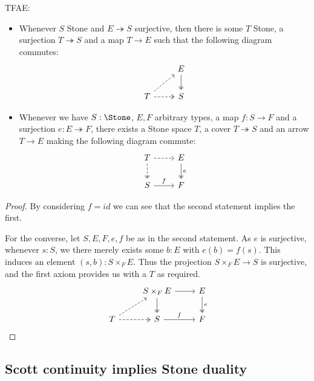 \begin{lemma}
  TFAE:
  \begin{itemize}
\item  Whenever $S$ Stone and $E\twoheadrightarrow S$ surjective, then there is some $T$ Stone,
    a surjection $T \twoheadrightarrow S$ and a map $T\to E$ 
    such that the following diagram commutes:
    \begin{equation}\begin{tikzcd}
      & E \arrow[d,""',two heads]\\
      T \arrow[ru,dashed]  \arrow[r,two heads, dashed ] &S %
    \end{tikzcd}\end{equation}  
\item
  Whenever we have $S:\Stone$, $E,F$ arbitrary types, a map $f:S \to F$ and a 
  surjection $e:E \twoheadrightarrow F$, 
  there exists a Stone space $T$, a cover $T\twoheadrightarrow S$ and an arrow $T\to E$ making the following diagram commute:
    \begin{equation}\begin{tikzcd}
      T \arrow[d,dashed, two heads ] \arrow[r,dashed]&  E \arrow[d,""',two heads, "e"]\\
      S  \arrow[r, "f"] & F
    \end{tikzcd}\end{equation}  
\end{itemize} 
\end{lemma}
\begin{proof}
  By considering $f=id$ we can see that the second statement implies the first. 

  For the converse, let $S,E,F,e,f$ be as in the second statement. 
  As $e$ is surjective, whenever $s:S$, we there merely exists some $b:E$ with $e(b) = f(s)$. 
  This induces an element $(s,b):S\times_F E$. 
  Thus the projection $S\times_F E \to S$ is surjective, and 
  the first axiom provides us with a $T$ as required. 
    \begin{equation}\begin{tikzcd}
     & S \times_F E \arrow[r] \arrow[d,two heads] &  E \arrow[d,""',two heads, "e"]\\
       T \arrow[r, two heads ,dashed ] \arrow[ru,dashed]& 
       S  \arrow[r, "f"] & F
    \end{tikzcd}\end{equation}  
    
\end{proof}

\subsection{Scott continuity implies Stone duality}
